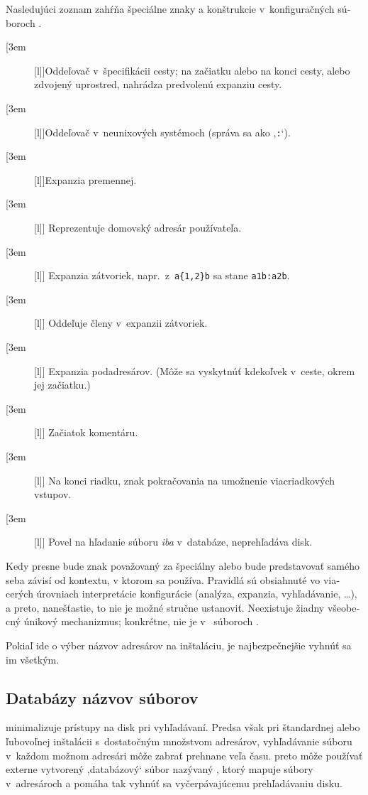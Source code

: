 \documentclass[\classoptions,slovak,english,czech]{\classname}
\newcommand{\singleuv}[1]{,#1`}
\begin{document}
\begin{otherlanguage}{slovak}
Nasledujúci zoznam zahŕňa špeciálne znaky a konštrukcie v~konfiguračných
súboroch \KPS{}.

\newcommand{\CODE}[1]{\makebox[3em][l]{\code{#1}}}
\begin{description}
\item[\CODE{:}]Oddeľovač v~špecifikácii cesty; na začiatku alebo
  na konci cesty, alebo zdvojený uprostred, nahrádza predvolenú expanziu cesty.\par
\item[\CODE{;}]Oddeľovač v~neunixových systémoch (správa sa ako
   \singleuv{\texttt{:}}).
\item[\CODE{\$}]Expanzia premennej.
\item[\CODE{\string~}] Reprezentuje domovský adresár používateľa.
\item[\CODE{\char`\{...\char`\}}] Expanzia zátvoriek, napr.\
  z~\verb+a{1,2}b+ sa stane \verb+a1b:a2b+.
\item[\CODE{,}] Oddeľuje členy v~expanzii zátvoriek.
\item[\CODE{//}] Expanzia podadresárov. (Môže sa
  vyskytnúť kdekoľvek v~ceste, okrem jej začiatku.)
\item[\CODE{\%{\rm\ a }\#}] Začiatok komentáru.
\item[\CODE{\bs}] Na konci riadku, znak pokračovania na umožnenie viacriadkových vstupov.
\item[\CODE{!!}] Povel na hľadanie súboru \emph{iba} v~databáze,
  neprehľadáva disk.
\end{description}

Kedy presne bude znak považovaný za špeciálny alebo bude predstavovať 
samého seba závisí od kontextu, v ktorom sa používa. Pravidlá sú obsiahnuté vo
viacerých úrovniach interpretácie konfigurácie (analýza,
expanzia, vyhľadávanie, \ldots), a preto, nanešťastie, to nie je možné stručne ustanoviť. 
Neexistuje žiadny všeobecný únikový mechanizmus; konkrétne,
\samp{\bs} nie je  v~ súboroch .

Pokiaľ ide o výber názvov adresárov na inštaláciu, je najbezpečnejšie
vyhnúť sa im všetkým.

\subsection{Databázy názvov súborov}
\label{sec:filename.database}

\KPS{} minimalizuje prístupy na disk pri vyhľadávaní. Predsa však
pri štandardnej alebo ľubovoľnej inštalácii 
s~dostatočným množstvom adresárov, vyhľadávanie súboru
v~každom možnom adresári môže zabrať prehnane veľa času.
\KPS{} preto môže používať externe vytvorený \singleuv{databázový} súbor
nazývaný \file{ls-R}, ktorý mapuje súbory v~adresároch a pomáha tak
vyhnúť sa vyčerpávajúcemu prehľadávaniu disku.


\end{otherlanguage}
\end{document}
